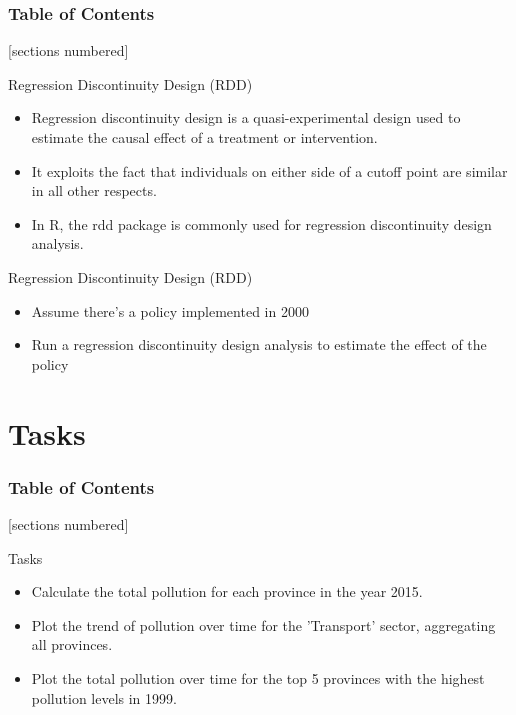 \documentclass[serif, 9pt, aspectratio=32]{beamer}
\begin{document}
\begin{frame}
    \frametitle{Table of Contents}
    [sections numbered]
    \tableofcontents[currentsection]
\end{frame}

\begin{frame}{Regression Discontinuity Design (RDD)}
    \begin{itemize}
        \setlength{\itemsep}{3em}
        \item Regression discontinuity design is a quasi-experimental design used to estimate the causal effect of a treatment or intervention.
        \item It exploits the fact that individuals on either side of a cutoff point are similar in all other respects.
        \item In R, the rdd package is commonly used for regression discontinuity design analysis.
    \end{itemize}
\end{frame}

\begin{frame}{Regression Discontinuity Design (RDD)}
    \begin{itemize}
        \setlength{\itemsep}{3em}
        \item Assume there's a policy implemented in 2000
        \item Run a regression discontinuity design analysis to estimate the effect of the policy
    \end{itemize}
\end{frame}

\section{Tasks}

\begin{frame}
    \frametitle{Table of Contents}
    [sections numbered]
    \tableofcontents[currentsection]
\end{frame}

\begin{frame}{Tasks}
    \begin{itemize}
        \setlength{\itemsep}{3em}
        \item Calculate the total pollution for each province in the year 2015.
        \item Plot the trend of pollution over time for the 'Transport' sector, aggregating all provinces.
        \item Plot the total pollution over time for the top 5 provinces with the highest pollution levels in 1999.
    \end{itemize}
\end{frame}
\end{document}
